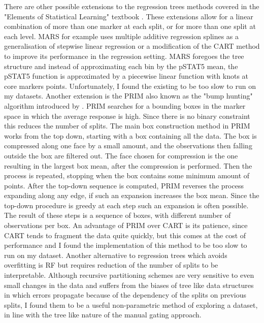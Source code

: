 There are other possible extensions to the regression trees methods covered in the "Elements of Statistical Learning" textbook \citep{Anonymous:ikywRZeA}.
These extensions allow for a linear combination of more than one marker at each split, or for more than one split at each level.
\gls{MARS} for example uses multiple additive regression splines as a generalisation of stepwise linear regression or a modification of the CART method to improve its performance in the regression setting.
\gls{MARS} foregoes the tree structure and instead of approximating each bin by the pSTAT5 mean, the pSTAT5 function is approximated by a piecewise linear function with knots at core markers points.
Unfortunately, I found the existing  to be too slow to run on my datasets.
Another extension is the \gls{PRIM} also known as the "bump hunting" algorithm introduced by \citet{Friedman:1999iy}.
\gls{PRIM} searches for a bounding boxes in the marker space in which the average response is high.
Since there is no binary constraint this reduces the number of splits.
The main box construction method in PRIM works from the top down, starting with a box containing all the data.
The box is compressed along one face by a small amount, and the observations then falling outside the box are filtered out.
The face chosen for compression is the one resulting in the largest box mean, after the compression is performed.
Then the process is repeated, stopping when the box contains some minimum amount of points.
After the top-down sequence is computed, PRIM reverses the process expanding along any edge, if such an expansion increases the box mean.
Since the top-down procedure is greedy at each step such an expansion is often possible.
The result of these steps is a sequence of boxes, with different number of observations per box.
An advantage of PRIM over CART is its patience, since CART tends to fragment the data quite quickly, but this comes at the cost of performance and I found the  implementation of this method to be too slow to run on my dataset.
%
Another alternative to regression trees which avoids overfitting is \gls{RF} but requires reduction of the number of splits to be interpretable.
Although recursive partitioning schemes are very sensitive to even small changes in the data and suffers from the biases of tree like data structures in which errors propagate because of the dependency of the splits on previous splits, I found them to be a useful non-parametric method of exploring a dataset, in line with the tree like nature of the manual gating approach.

